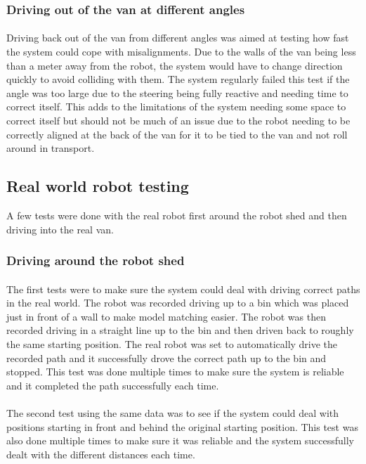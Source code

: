 \subsubsection{Driving out of the van at different angles}
\paragraph{}
Driving back out of the van from different angles was aimed at testing how fast the system could cope with misalignments. Due to the walls of the van being less than a meter away from the robot, the system would have to change direction quickly to avoid colliding with them. The system regularly failed this test if the angle was too large due to the steering being fully reactive and needing time to correct itself. This adds to the limitations of the system needing some space to correct itself but should not be much of an issue due to the robot needing to be correctly aligned at the back of the van for it to be tied to the van and not roll around in transport.

\subsection{Real world robot testing}
A few tests were done with the real robot first around the robot shed and then driving into the real van.
\subsubsection{Driving around the robot shed}
\paragraph{}
The first tests were to make sure the system could deal with driving correct paths in the real world. The robot was recorded driving up to a bin which was placed just in front of a wall to make model matching easier. The robot was then recorded driving in a straight line up to the bin and then driven back to roughly the same starting position. The real robot was set to automatically drive the recorded path and it successfully drove the correct path up to the bin and stopped. This test was done multiple times to make sure the system is reliable and it completed the path successfully each time.

\paragraph{}
The second test using the same data was to see if the system could deal with positions starting in front and behind the original starting position. This test was also done multiple times to make sure it was reliable and the system successfully dealt with the different distances each time.

